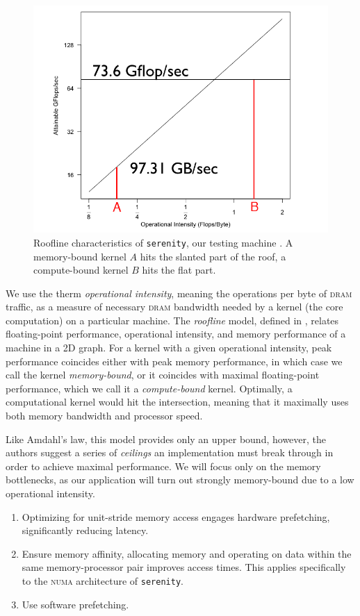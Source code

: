 \documentclass[a4paper,11pt, oneside]{report}
\newcommand{\code}[1]{\texttt{#1}}
\newcommand{\concept}[1]{\emph{#1}}
\newcommand{\acro}[1]{\textsc{#1}}
\begin{document}
\begin{figure}[ht]
	\centering
	\includegraphics[width=0.9\columnwidth]{serenity-rooftop.png}
	\caption{Roofline characteristics of \code{serenity}, our testing machine \cite{serenity}. A memory-bound kernel $A$ hits the slanted part of the roof, a compute-bound kernel $B$  hits the flat part.} \label{fig:roofline}
\end{figure}
We use the therm \concept{operational intensity}, meaning the operations per byte of \acro{dram} traffic, as a measure of necessary \acro{dram} bandwidth needed by a kernel (the core computation) on a particular machine. The \concept{roofline} model, defined in \cite{williams-waterman-patterson}, relates floating-point performance, operational intensity, and memory performance of a machine in a 2D graph. For a kernel with a given operational intensity, peak performance coincides either with peak memory performance, in which case we call the kernel \concept{memory-bound}, or it coincides with maximal floating-point performance, which we call it a \concept{compute-bound} kernel. Optimally, a computational kernel would hit the intersection, meaning that it maximally uses both memory bandwidth and processor speed.


Like Amdahl's law, this model provides only an upper bound, however, the authors suggest a series of \concept{ceilings} an implementation must break through in order to achieve maximal performance. We will focus only on the memory bottlenecks, as our application will turn out strongly memory-bound due to a low operational intensity.
\begin{enumerate}
\item Optimizing for unit-stride memory access engages hardware prefetching, significantly reducing latency.
\item Ensure memory affinity, allocating memory and operating on data within the same memory-processor pair improves access times. This applies specifically to the \acro{numa} architecture of \code{serenity}.
\item Use software prefetching.
\end{enumerate}
\end{document}
